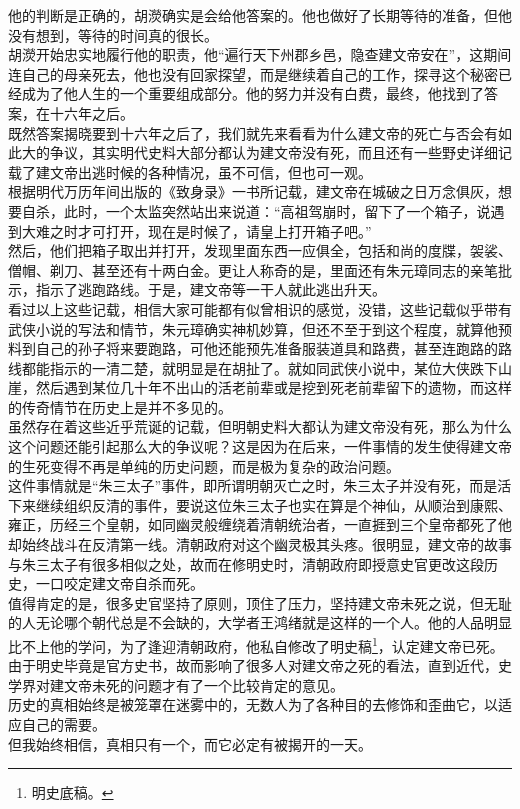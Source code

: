 \begin{multicols}{\theparacolNo}
他的判断是正确的，胡濙确实是会给他答案的。他也做好了长期等待的准备，但他没有想到，等待的时间真的很长。\\

胡濙开始忠实地履行他的职责，他“遍行天下州郡乡邑，隐查建文帝安在”，这期间连自己的母亲死去，他也没有回家探望，而是继续着自己的工作，探寻这个秘密已经成为了他人生的一个重要组成部分。他的努力并没有白费，最终，他找到了答案，在十六年之后。\\

既然答案揭晓要到十六年之后了，我们就先来看看为什么建文帝的死亡与否会有如此大的争议，其实明代史料大部分都认为建文帝没有死，而且还有一些野史详细记载了建文帝出逃时候的各种情况，虽不可信，但也可一观。\\

根据明代万历年间出版的《致身录》一书所记载，建文帝在城破之日万念俱灰，想要自杀，此时，一个太监突然站出来说道：“高祖驾崩时，留下了一个箱子，说遇到大难之时才可打开，现在是时候了，请皇上打开箱子吧。”\\

然后，他们把箱子取出并打开，发现里面东西一应俱全，包括和尚的度牒，袈裟、僧帽、剃刀、甚至还有十两白金。更让人称奇的是，里面还有朱元璋同志的亲笔批示，指示了逃跑路线。于是，建文帝等一干人就此逃出升天。\\

看过以上这些记载，相信大家可能都有似曾相识的感觉，没错，这些记载似乎带有武侠小说的写法和情节，朱元璋确实神机妙算，但还不至于到这个程度，就算他预料到自己的孙子将来要跑路，可他还能预先准备服装道具和路费，甚至连跑路的路线都能指示的一清二楚，就明显是在胡扯了。就如同武侠小说中，某位大侠跌下山崖，然后遇到某位几十年不出山的活老前辈或是挖到死老前辈留下的遗物，而这样的传奇情节在历史上是并不多见的。\\

虽然存在着这些近乎荒诞的记载，但明朝史料大都认为建文帝没有死，那么为什么这个问题还能引起那么大的争议呢？这是因为在后来，一件事情的发生使得建文帝的生死变得不再是单纯的历史问题，而是极为复杂的政治问题。\\

这件事情就是“朱三太子”事件，即所谓明朝灭亡之时，朱三太子并没有死，而是活下来继续组织反清的事件，要说这位朱三太子也实在算是个神仙，从顺治到康熙、雍正，历经三个皇朝，如同幽灵般缠绕着清朝统治者，一直捱到三个皇帝都死了他却始终战斗在反清第一线。清朝政府对这个幽灵极其头疼。很明显，建文帝的故事与朱三太子有很多相似之处，故而在修明史时，清朝政府即授意史官更改这段历史，一口咬定建文帝自杀而死。\\

值得肯定的是，很多史官坚持了原则，顶住了压力，坚持建文帝未死之说，但无耻的人无论哪个朝代总是不会缺的，大学者王鸿绪就是这样的一个人。他的人品明显比不上他的学问，为了逢迎清朝政府，他私自修改了明史稿\footnote{明史底稿。}，认定建文帝已死。由于明史毕竟是官方史书，故而影响了很多人对建文帝之死的看法，直到近代，史学界对建文帝未死的问题才有了一个比较肯定的意见。\\

历史的真相始终是被笼罩在迷雾中的，无数人为了各种目的去修饰和歪曲它，以适应自己的需要。\\

但我始终相信，真相只有一个，而它必定有被揭开的一天。\\
\ifnum{}
	\end{multicols}
